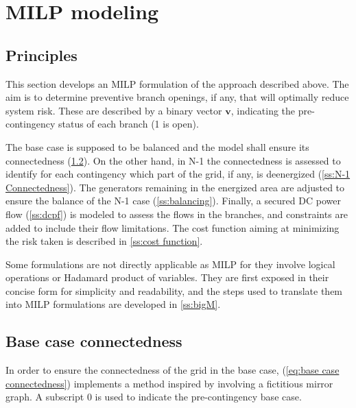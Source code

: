 \section{MILP modeling}
\subsection{Principles}
This section develops an MILP formulation of the approach described above. 
The aim is to determine preventive branch openings, if any, that will optimally reduce system risk. These are described by a binary vector $\pmb{v}$, indicating the pre-contingency status of each branch (1 is open). 

The base case is supposed to be balanced and the model shall ensure its connectedness
(\ref{ss:base case connectedness}). On the other hand, in N-1 the connectedness is
assessed to identify for each contingency which part of the grid, if any, is deenergized
(\ref{ss:N-1 Connectedness}). The generators remaining in the energized area are
adjusted to ensure the balance of the N-1 case (\ref{ss:balancing}).
Finally, a secured DC power flow (\ref{ss:dcpf}) is modeled to assess the flows in
the branches, and constraints are added to include their flow limitations. The cost
function aiming at minimizing the risk taken is described in \ref{ss:cost function}.

Some formulations are not directly applicable as MILP for they involve logical operations
or Hadamard product of variables. They are first exposed in their concise form
for simplicity and readability, and the steps used to translate them into MILP formulations are developed in \ref{ss:bigM}.

\subsection{Base case connectedness}
\label{ss:base case connectedness} In order to ensure the connectedness of the grid
in the base case, (\ref{eq:base case connectedness}) implements a method inspired by \cite{hanEnsuringNetworkConnectedness2021} involving
a fictitious mirror graph. A subscript $0$ is used to indicate the pre-contingency base case.

